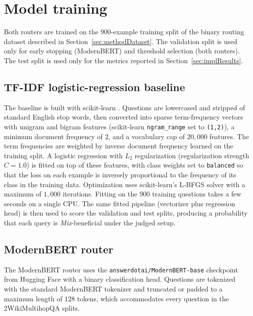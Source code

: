 \documentclass[english, bibtex]{kththesis}               %
\numberwithin{listing}{chapter}
\begin{document}
\section{Model training}
\label{sec:implTraining}

Both routers are trained on the 900-example training split of the binary routing dataset described in Section~\ref{sec:methodDataset}. The validation split is used only for early stopping (ModernBERT) and threshold selection (both routers). The test split is used only for the metrics reported in Section~\ref{sec:implResults}.

\subsection{TF-IDF logistic-regression baseline}
\label{sec:implTfidf}

The baseline is built with scikit-learn \cite{pedregosa2011scikit}. Questions are lowercased and stripped of standard English stop words, then converted into sparse term-frequency vectors with unigram and bigram features (scikit-learn \texttt{ngram\_range} set to \texttt{(1,2)}), a minimum document frequency of $2$, and a vocabulary cap of $20{,}000$ features. The term frequencies are weighted by inverse document frequency \cite{salton1988termweighting} learned on the training split. A logistic regression with $L_2$ regularization (regularization strength $C=1.0$) is fitted on top of these features, with class weights set to \texttt{balanced} so that the loss on each example is inversely proportional to the frequency of its class in the training data. Optimization uses scikit-learn's L-BFGS solver \cite{liu1989limited} with a maximum of $1{,}000$ iterations. Fitting on the 900 training questions takes a few seconds on a single CPU. The same fitted pipeline (vectorizer plus regression head) is then used to score the validation and test splits, producing a probability that each query is \emph{Mix}-beneficial under the judged setup.

\subsection{ModernBERT router}
\label{sec:implModernBert}

The ModernBERT router uses the \texttt{answerdotai/ModernBERT-base} checkpoint from Hugging Face \cite{warner2024modernbert} with a binary classification head. Questions are tokenized with the standard ModernBERT tokenizer and truncated or padded to a maximum length of 128 tokens, which accommodates every question in the 2WikiMultihopQA splits.
\end{document}
